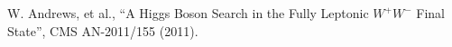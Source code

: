 \clearpage

\vspace*{-0.2cm}

W. Andrews, et al., “A Higgs Boson Search in the Fully Leptonic $W^+W^-$ Final State”, CMS AN-2011/155 (2011).

